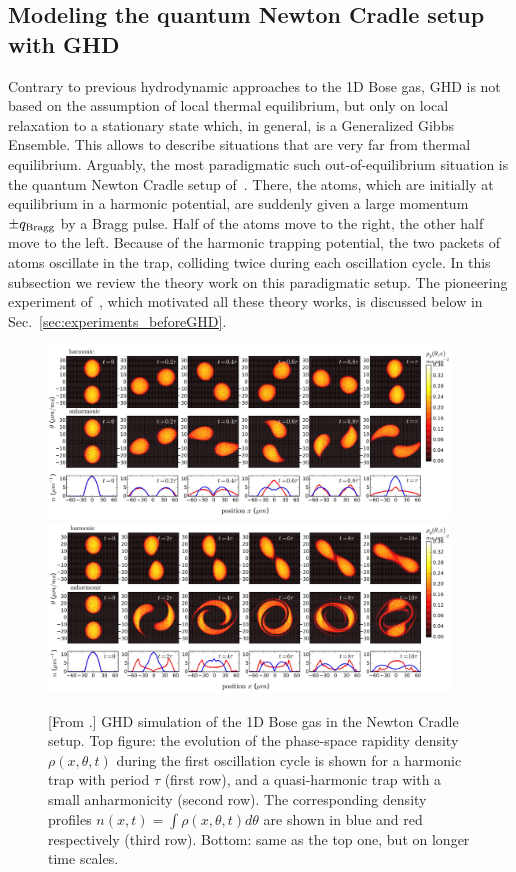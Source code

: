 \documentclass[onecolumn,amsfonts,showpacs,superscriptaddress]{revtex4-1}
\begin{document}
\subsection{Modeling the quantum Newton Cradle setup with GHD}
\label{susec:modelingNC}
Contrary to previous hydrodynamic approaches to the 1D Bose gas, GHD is not based on the assumption of local thermal equilibrium, but only on local relaxation to a stationary state which, in general, is a Generalized Gibbs Ensemble. This allows to describe situations that are very far from thermal equilibrium. Arguably, the most paradigmatic such out-of-equilibrium situation is the quantum Newton Cradle setup of~\cite{kinoshita2006quantum}. There, the atoms, which are initially at equilibrium in a harmonic potential, are suddenly given a large momentum $\pm q_{\rm Bragg}$ by a Bragg pulse. Half of the atoms move to the right, the other half move to the left. Because of the harmonic trapping potential, the two packets of atoms oscillate in the trap, colliding twice during each oscillation cycle. In this subsection we review the theory work on this paradigmatic setup. The pioneering experiment of~\cite{kinoshita2006quantum}, which motivated all these theory works, is discussed below in Sec.~\ref{sec:experiments_beforeGHD}.






\begin{figure}
    \centering
    \includegraphics[width=0.95\textwidth]{figures/qnc_short.png}
    \includegraphics[width=0.95\textwidth]{figures/qnc_long.png}
    \caption{[From \citep{caux2019hydrodynamics}.] GHD simulation of the 1D Bose gas in the Newton Cradle setup. Top figure: the evolution of the phase-space rapidity density $\rho(x,\theta,t)$ during the first oscillation cycle is shown for a harmonic trap with period $\tau$ (first row), and a quasi-harmonic trap with a small anharmonicity (second row). The corresponding density profiles $n(x,t) = \int \rho(x,\theta,t ) d\theta$ are shown in blue and red respectively (third row). Bottom: same as the top one, but on longer time scales.}
    \label{fig:QNCtheory}
\end{figure}
\end{document}
